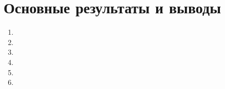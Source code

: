 \chapter*{Основные результаты и выводы}
\label{chap:conclusion}

\begin{enumerate}
	\item \lipsum[1]

	\item \lipsum[2]

	\item \lipsum[3]

	\item \lipsum[4]

	\item \lipsum[5]

	\item \lipsum[6]
\end{enumerate}
